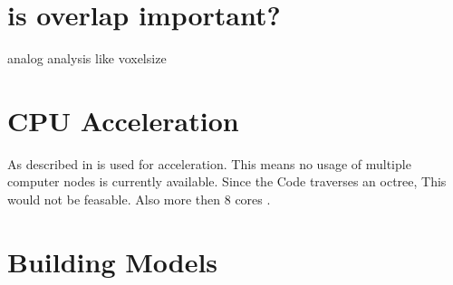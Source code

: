\section{is overlap important?}
% 
analog analysis like voxelsize
% 
\section{CPU Acceleration}
% 
As described in \dummy \openmp is used for acceleration.
This means no usage of multiple computer nodes is currently available.
Since the Code traverses an octree, This would not be feasable.
Also more then 8 cores \dummy.
% 
\section{Building Models}
% 
\tikzexternaldisable
% 
\begin{figure}[!tb]
\centering
\caption{}
\end{figure}
% 
% 
\tikzexternalenable
